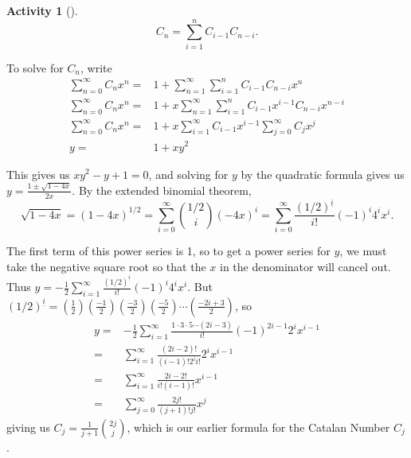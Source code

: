 \documentclass[10pt,]{book}
\theoremstyle{plain}
\theoremstyle{definition}
\newtheorem{activity}[project]{Activity}
\numberwithin{equation}{chapter}
\newcommand{\amp}{&}
\begin{document}
\begin{activity}[]
\begin{equation*}
C_n=\sum_{i=1}^nC_{i-1}C_{n-i}.
\end{equation*}
%
\par
To solve for \(C_n\), write%
\begin{align*}
\sum_{n=0}^\infty C_nx^n  =\amp 1+\sum_{n=1}^\infty\sum_{i=1}^nC_{i-1}C_{n-i}x^n\\
\sum_{n=0}^\infty C_nx^n
=\amp 1+x\sum_{n=1}^\infty\sum_{i=1}^nC_{i-1}x^{i-1}C_{n-i}x^{n-i}\\
\sum_{n=0}^\infty C_nx^n
=\amp 1+x\sum_{i=1}^\infty C_{i-1}x^{i-1}\sum_{j=0}^\infty C_{j}x^{j}\\
y =\amp 1 + xy^2
\end{align*}
%
\par
This gives us \(xy^2-y+1=0\), and solving for \(y\) by the quadratic formula gives us \(y=\frac{1\pm \sqrt{1-4x}}{2x}\). By the extended binomial theorem,%
\begin{equation*}
\sqrt{1-4x}=(1-4x)^{1/2} = \sum_{i=0}^\infty \binom{1/2}{i}(-4x)^i=
\sum_{i=0}^\infty \frac{(1/2)^{\underline{i}}}{i!}(-1)^i4^ix^i.
\end{equation*}
%
\par
The first term of this power series is 1, so to get a power series for \(y\), we must take the negative square root so that the \(x\) in the denominator will cancel out. Thus \(y=-\frac{1}{2}\sum_{i=1}^\infty \frac{(1/2)^{\underline{i}}}{i!}(-1)^i4^ix^i\). But \((1/2)^{\underline{i}}=(\frac{1}{2})(\frac{-1}{2})(\frac{-3}{2})(\frac{-5}{2})\cdots (\frac{-2i+3}{2})\), so%
\begin{align*}
y =\amp -\frac{1}{2}\sum_{i=1}^\infty\frac{1\cdot3\cdot5\cdots(2i-3)}{i!}(-1)^{2i-1}2^ix^{i-1}\\
=\amp  \sum_{i=1}^\infty \frac{(2i-2)!}{(i-1)!2^{i}i!}2^ix^{i-1}\\
=\amp  \sum_{i=1}^\infty\frac{2i-2!}{i!(i-1)!}x^{i-1}\\
=\amp \sum_{j=0}^\infty\frac{2j!}{(j+1)!j!}x^j
\end{align*}
giving us \(C_j=\frac{1}{j+1}\binom{2j}{j}\), which is our earlier formula for the Catalan Number \(C_j\).%
\end{activity}
\typeout{************************************************}
\typeout{************************************************}
\end{document}
